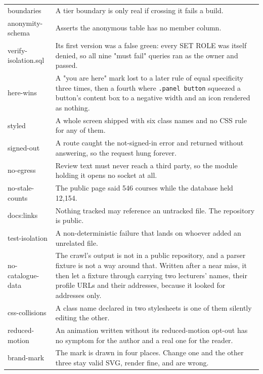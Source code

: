 \documentclass[11pt,a4paper]{article}
\begin{document}
\begin{center}
\sffamily\scriptsize
\begin{tabular}{@{}>{\ttfamily}p{3.5cm} p{10.7cm}@{}}
\toprule
boundaries & A tier boundary is only real if crossing it fails a build. \\
anonymity-schema & Asserts the anonymous table has no member column. \\
verify-isolation.sql & Its first version was a false green: every SET ROLE was itself denied, so all nine "must fail" queries ran as the owner and passed. \\
here-wins & A "you are here" mark lost to a later rule of equal specificity three times, then a fourth where \texttt{.panel button} squeezed a button's content box to a negative width and an icon rendered as nothing. \\
styled & A whole screen shipped with six class names and no CSS rule for any of them. \\
signed-out & A route caught the not-signed-in error and returned without answering, so the request hung forever. \\
no-egress & Review text must never reach a third party, so the module holding it opens no socket at all. \\
no-stale-counts & The public page said 546 courses while the database held 12,154. \\
docs:links & Nothing tracked may reference an untracked file. The repository is public. \\
test-isolation & A non-deterministic failure that lands on whoever added an unrelated file. \\
no-catalogue-data & The crawl's output is not in a public repository, and a parser fixture is not a way around that. Written after a near miss, it then let a fixture through carrying two lecturers' names, their profile URLs and their addresses, because it looked for addresses only. \\
css-collisions & A class name declared in two stylesheets is one of them silently editing the other. \\
reduced-motion & An animation written without its reduced-motion opt-out has no symptom for the author and a real one for the reader. \\
brand-mark & The mark is drawn in four places. Change one and the other three stay valid SVG, render fine, and are wrong. \\
\bottomrule
\end{tabular}
\end{center}
\end{document}

